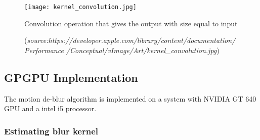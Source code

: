 \begin{figure}[h!]
	\centering
	\texttt{[image: kernel\_convolution.jpg]}
	\caption{Convolution operation that gives the output with size equal to input}
	\caption*{\small(\textit{source:https://developer.apple.com/library/content/documentation/Performance
			/Conceptual/vImage/Art/kernel\_convolution.jpg})}
	\label{fig:convolution}
\end{figure}
\subsection{GPGPU Implementation}
The motion de-blur algorithm is implemented on a system with NVIDIA GT 640 GPU and a intel i5 processor.\\
\subsubsection{Estimating blur kernel}
